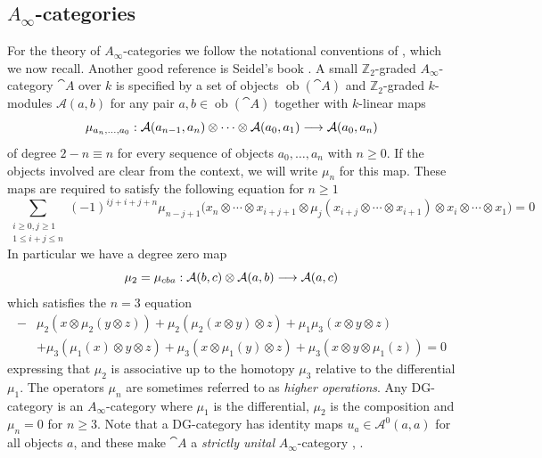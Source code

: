 \documentclass[english,letter paper,12pt,leqno]{article}
\theoremstyle{example}
\numberwithin{equation}{section}
\def\AA{\mathcal{A}}
\def\be{\begin{equation}}
\def\ee{\end{equation}}
\def\nZ{\mathds{Z}}
\begin{document}
\subsection{$A_\infty$-categories}\label{section:ainfcat}

For the theory of $A_\infty$-categories we follow the notational conventions of \cite[\S 2]{lazaroiu}, which we now recall. Another good reference is Seidel's book \cite{seidel}. A small $\nZ_2$-graded $A_\infty$-category $\cat{A}$ over $k$ is specified by a set of objects $\operatorname{ob}(\cat{A})$ and $\nZ_2$-graded $k$-modules $\AA(a,b)$ for any pair $a,b \in \operatorname{ob}(\cat{A})$ together with $k$-linear maps
\[
\mu_{a_n,\ldots,a_0}: \AA(a_{n-1}, a_n) \otimes \cdots \otimes \AA(a_0, a_1) \lto \AA(a_0,a_n)
\]
of degree $2 - n \equiv n$ for every sequence of objects $a_0,\ldots,a_n$ with $n \ge 0$. If the objects involved are clear from the context, we will write $\mu_n$ for this map. These maps are required to satisfy the following equation for $n \ge 1$
\be\label{eq_ainf_constraints}
\sum_{\substack{i \ge 0, j \ge 1 \\ 1 \le i + j \le n}} (-1)^{ij + i + j + n} \mu_{n-j+1}\Big( x_n \otimes \cdots \otimes x_{i+j+1} \otimes \mu_j( x_{i+j} \otimes \cdots \otimes x_{i+1} ) \otimes x_i \otimes \cdots \otimes x_1 \Big) = 0
\ee
In particular we have a degree zero map
\[
\mu_2 = \mu_{cba}: \AA(b,c) \otimes \AA(a,b) \lto \AA(a,c)
\]
which satisfies the $n = 3$ equation
\begin{align*}
- &\mu_2( x \otimes \mu_2( y \otimes z ) ) + \mu_2( \mu_2( x \otimes y ) \otimes z ) + \mu_1 \mu_3( x \otimes y \otimes z )\\
& + \mu_3( \mu_1(x) \otimes y \otimes z ) + \mu_3( x \otimes \mu_1(y) \otimes z ) + \mu_3( x \otimes y \otimes \mu_1(z) ) = 0
\end{align*}
expressing that $\mu_2$ is associative up to the homotopy $\mu_3$ relative to the differential $\mu_1$. The operators $\mu_n$ are sometimes referred to as \emph{higher operations}. Any DG-category is an $A_\infty$-category where $\mu_1$ is the differential, $\mu_2$ is the composition and $\mu_n = 0$ for $n \ge 3$. Note that a DG-category has identity maps $u_a \in \AA^0(a,a)$ for all objects $a$, and these make $\cat{A}$ a \emph{strictly unital} $A_\infty$-category \cite[\S 2.1]{lazaroiu}, \cite[\S I.2]{seidel}.
\end{document}
